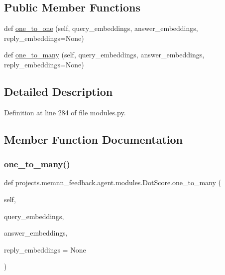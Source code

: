 \subsection*{Public Member Functions}
\begin{DoxyCompactItemize}
\item 
def \hyperlink{classprojects_1_1memnn__feedback_1_1agent_1_1modules_1_1DotScore_aa8bc1b8eefcd08b7e2bf4540a379ad41}{one\+\_\+to\+\_\+one} (self, query\+\_\+embeddings, answer\+\_\+embeddings, reply\+\_\+embeddings=None)
\item 
def \hyperlink{classprojects_1_1memnn__feedback_1_1agent_1_1modules_1_1DotScore_a0c541c0daa225e3a8cf4918068afa591}{one\+\_\+to\+\_\+many} (self, query\+\_\+embeddings, answer\+\_\+embeddings, reply\+\_\+embeddings=None)
\end{DoxyCompactItemize}


\subsection{Detailed Description}


Definition at line 284 of file modules.\+py.



\subsection{Member Function Documentation}
\mbox{\label{classprojects_1_1memnn__feedback_1_1agent_1_1modules_1_1DotScore_a0c541c0daa225e3a8cf4918068afa591}} 
\subsubsection{\texorpdfstring{one\+\_\+to\+\_\+many()}{one\_to\_many()}}
{\footnotesize\ttfamily def projects.\+memnn\+\_\+feedback.\+agent.\+modules.\+Dot\+Score.\+one\+\_\+to\+\_\+many (\begin{DoxyParamCaption}\item[{}]{self,  }\item[{}]{query\+\_\+embeddings,  }\item[{}]{answer\+\_\+embeddings,  }\item[{}]{reply\+\_\+embeddings = {\ttfamily None} }\end{DoxyParamCaption})}



